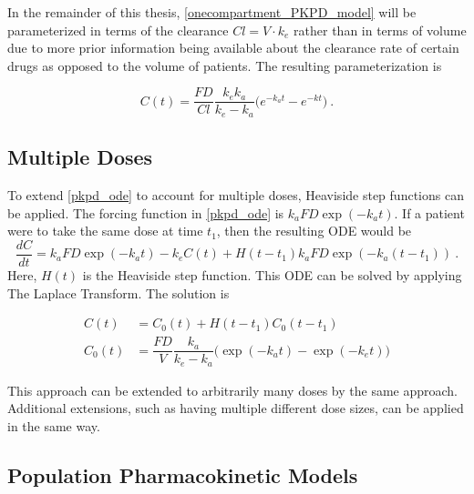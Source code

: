 In the remainder of this thesis, \cref{onecompartment_PKPD_model} will be parameterized in terms of the clearance  $\mathit{Cl} = V \cdot k_e$ rather than in terms of volume due to more prior information being available about the clearance rate of certain drugs as opposed to the volume of patients.  The resulting parameterization is

\begin{equation}\label{onecompartment_PKPD_cl}
	C(t) = \dfrac{F D}{\mathit{Cl}}\dfrac{k_ek_a}{k_e - k_a}\Big(e^{-k_at} - e^{-kt}\Big) \>.
\end{equation}


\subsection{Multiple Doses}

To extend \cref{pkpd_ode} to account for multiple doses, Heaviside step functions can be applied.  The forcing function in \cref{pkpd_ode} is $ k_aFD\exp(-k_a t)$.  If a patient were to take the same dose at time $t_1$, then the resulting ODE would be
\begin{equation}  \label{pkpd_ode_2_doses}
	\dfrac{dC}{dt} = k_aFD\exp(-k_a t) - k_eC(t) + H(t-t_1)k_aFD\exp(-k_a (t-t_1)) \>.
\end{equation}
\noindent Here, $H(t)$ is the Heaviside step function.  This ODE can be solved by applying The Laplace Transform.  The solution is 

\begin{align*}
	C(t) &=  C_0(t) + H(t-t_1)C_0(t-t_1)\\
	C_0(t) &= \dfrac{F D}{V}\dfrac{k_a}{k_e - k_a}\Big(\exp(-k_at) - \exp(-k_et)\Big)
\end{align*}

\noindent  This approach can be extended to arbitrarily many doses by the same approach.  Additional extensions, such as having multiple different dose sizes, can be applied in the same way.


\subsection{Population Pharmacokinetic Models}


